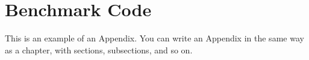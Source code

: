 
\chapter{Benchmark Code}
\label{ch:benchmark_code}

This is an example of an Appendix. You can write an Appendix in the same way as a chapter, with sections, subsections, and so on.

